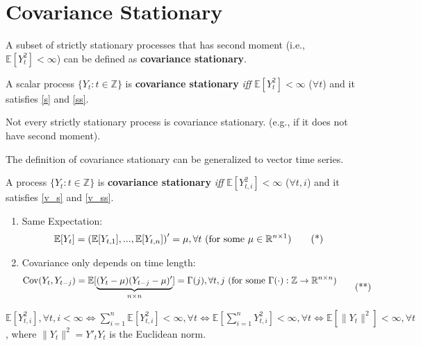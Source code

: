 \documentclass[11pt]{elegantbook}
\begin{document}
\section{Covariance Stationary}
A subset of strictly stationary processes that has second moment (i.e., $\mathbb{E}[Y_t^2]<\infty$) can be defined as \textbf{covariance stationary}.
\begin{definition}
    A scalar process $\{Y_t:t\in \mathbb{Z}\}$ is \textbf{covariance stationary} \textit{iff} $\mathbb{E}[Y_t^2]<\infty$ ($\forall t$) and it satisfies \eqref{s} and \eqref{ss}.
\end{definition}
\begin{note}
    Not every strictly stationary process is covariance stationary. (e.g., if it does not have second moment).
\end{note}
The definition of covariance stationary can be generalized to vector time series.
\begin{definition}
    A process $\{Y_t:t\in \mathbb{Z}\}$ is \textbf{covariance stationary} \textit{iff} $\mathbb{E}[Y_{t,i}^2]<\infty$ ($\forall t,i$) and it satisfies \eqref{v_s} and \eqref{v_ss}.
    \begin{enumerate}
        \item Same Expectation:
        \begin{equation}
            \begin{aligned}
                \mathbb{E}[Y_t]=\left(\mathbb{E}[Y_{t,1}],...,\mathbb{E}[Y_{t,n}]\right)'=\mu, \forall t \textnormal{ (for some $\mu\in \mathbb{R}^{n\times 1}$)}
            \end{aligned}
            \label{v_s}
            \tag{*}
        \end{equation}
        \item Covariance only depends on time length:
        \begin{equation}
            \begin{aligned}
                \textnormal{Cov}(Y_t,Y_{t-j})=\mathbb{E}[\underbrace{(Y_t-\mu)(Y_{t-j}-\mu)'}_{n\times n}]=\Gamma(j), \forall t,j \textnormal{ (for some $\Gamma(\cdot): \mathbb{Z} \rightarrow \mathbb{R}^{n\times n}$)}
            \end{aligned}
            \label{v_ss}
            \tag{**}
        \end{equation}
    \end{enumerate}
\end{definition}
\begin{note}
    $\mathbb{E}[Y_{t,i}^2],\forall t,i<\infty \Leftrightarrow \sum_{i=1}^n \mathbb{E}[Y_{t,i}^2]<\infty,\forall t \Leftrightarrow \mathbb{E}[\sum_{i=1}^n Y_{t,i}^2]<\infty,\forall t\Leftrightarrow \mathbb{E}\left[\|Y_t\|^2\right]<\infty,\forall t$, where $\|Y_t\|^2=Y'_tY_t$ is the Euclidean norm.
\end{note}
\end{document}
